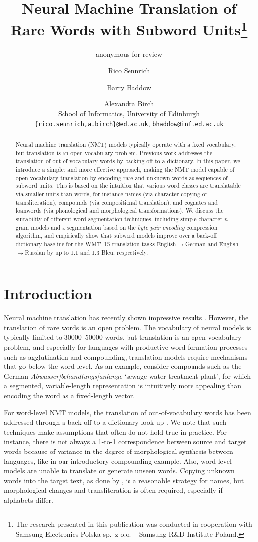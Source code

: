 \documentclass[11pt]{article}
\title{Neural Machine Translation of Rare Words with Subword Units\thanks{The research presented in this publication was conducted in cooperation with Samsung Electronics Polska sp.\ z o.o.\ - Samsung R\&D Institute Poland.} }
\author{anonymous for review}
\author{
Rico Sennrich\and Barry Haddow \and Alexandra Birch\\
School of Informatics, University of Edinburgh\\
{\tt \{rico.sennrich,a.birch\}@ed.ac.uk}, {\tt bhaddow@inf.ed.ac.uk}
}
\date{}
\newcommand{\pipe}{{\color{gray}|}}
\begin{document}
\maketitle
\begin{abstract}
Neural machine translation (NMT) models typically operate with a fixed vocabulary, but translation is an open-vocabulary problem.
Previous work addresses the translation of out-of-vocabulary words by backing off to a dictionary.
In this paper, we introduce a simpler and more effective approach, making the NMT model capable of open-vocabulary translation by encoding rare and unknown words as sequences of subword units.
This is based on the intuition that various word classes are translatable via smaller units than words, for instance
names (via character copying or transliteration), compounds (via compositional translation), and cognates and loanwords (via phonological and morphological transformations).
We discuss the suitability of different word segmentation techniques, including simple character $n$-gram models and a segmentation based on the \emph{byte pair encoding} compression algorithm,
and empirically show that subword models improve over a back-off dictionary baseline for the \mbox{WMT 15} translation tasks English$\to$German and English$\to$Russian by up to 1.1 and 1.3 {\sc Bleu}, respectively.
\end{abstract}

\section{Introduction}

Neural machine translation has recently shown impressive results \cite{kalchbrenner13emnlp,DBLP:conf/nips/SutskeverVL14,DBLP:journals/corr/BahdanauCB14}.
However, the translation of rare words is an open problem.
The vocabulary of neural models is typically limited to \num{30000}--\num{50000} words, but translation is an open-vocabulary problem,
and especially for languages with productive word formation processes such as agglutination and compounding, translation models require mechanisms that go below the word level.
As an example, consider compounds such as the German \emph{Abwasser\pipe behandlungs\pipe anlange} `sewage water treatment plant', for which a segmented, variable-length representation is intuitively more appealing than encoding the word as a fixed-length vector.

For word-level NMT models, the translation of out-of-vocabulary words has been addressed through a back-off to a dictionary look-up \cite{jean15,DBLP:journals/corr/LuongSLVZ14}.
We note that such techniques make assumptions that often do not hold true in practice.
For instance, there is not always a 1-to-1 correspondence between source and target words because of variance in the degree of morphological synthesis between languages, like in our introductory compounding example.
Also, word-level models are unable to translate or generate unseen words.
Copying unknown words into the target text, as done by \cite{jean15,DBLP:journals/corr/LuongSLVZ14}, is a reasonable strategy for names, but morphological changes and transliteration is often required, especially if alphabets differ.
\end{document}
